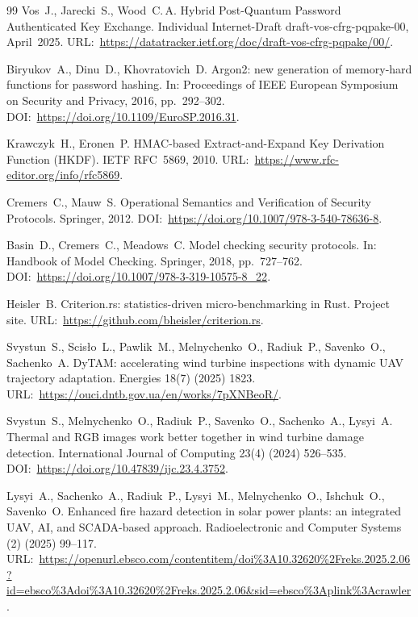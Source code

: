 \documentclass[preprint,12pt]{elsarticle}
\theoremstyle{remark}
\begin{document}
\begin{thebibliography}{99}
Vos~J., Jarecki~S., Wood~C.\,A.
Hybrid Post-Quantum Password Authenticated Key Exchange.
Individual Internet-Draft draft-vos-cfrg-pqpake-00, April~2025.
URL:~\url{https://datatracker.ietf.org/doc/draft-vos-cfrg-pqpake/00/}.

Biryukov~A., Dinu~D., Khovratovich~D.
Argon2: new generation of memory-hard functions for password hashing.
In: Proceedings of IEEE European Symposium on Security and Privacy, 2016, pp.~292--302.
DOI:~\url{https://doi.org/10.1109/EuroSP.2016.31}.

Krawczyk~H., Eronen~P.
HMAC-based Extract-and-Expand Key Derivation Function (HKDF).
IETF RFC~5869, 2010.
URL:~\url{https://www.rfc-editor.org/info/rfc5869}.

Cremers~C., Mauw~S.
Operational Semantics and Verification of Security Protocols.
Springer, 2012.
DOI:~\url{https://doi.org/10.1007/978-3-540-78636-8}.

Basin~D., Cremers~C., Meadows~C.
Model checking security protocols.
In: Handbook of Model Checking. Springer, 2018, pp.~727--762.
DOI:~\url{https://doi.org/10.1007/978-3-319-10575-8_22}.

Heisler~B.
Criterion.rs: statistics-driven micro-benchmarking in Rust.
Project site.
URL:~\url{https://github.com/bheisler/criterion.rs}.

Svystun~S., Scis{\l}o~L., Pawlik~M., Melnychenko~O., Radiuk~P., Savenko~O., Sachenko~A.
DyTAM: accelerating wind turbine inspections with dynamic UAV trajectory adaptation.
Energies 18(7) (2025) 1823.
URL:~\url{https://ouci.dntb.gov.ua/en/works/7pXNBeoR/}.

Svystun~S., Melnychenko~O., Radiuk~P., Savenko~O., Sachenko~A., Lysyi~A.
Thermal and RGB images work better together in wind turbine damage detection.
International Journal of Computing 23(4) (2024) 526--535.
DOI:~\url{https://doi.org/10.47839/ijc.23.4.3752}.

Lysyi~A., Sachenko~A., Radiuk~P., Lysyi~M., Melnychenko~O., Ishchuk~O., Savenko~O.
Enhanced fire hazard detection in solar power plants: an integrated UAV, AI, and SCADA-based approach.
Radioelectronic and Computer Systems (2) (2025) 99--117.
URL:~\url{https://openurl.ebsco.com/contentitem/doi%3A10.32620%2Freks.2025.2.06?id=ebsco%3Adoi%3A10.32620%2Freks.2025.2.06&sid=ebsco%3Aplink%3Acrawler}.

\end{thebibliography}
\end{document}
